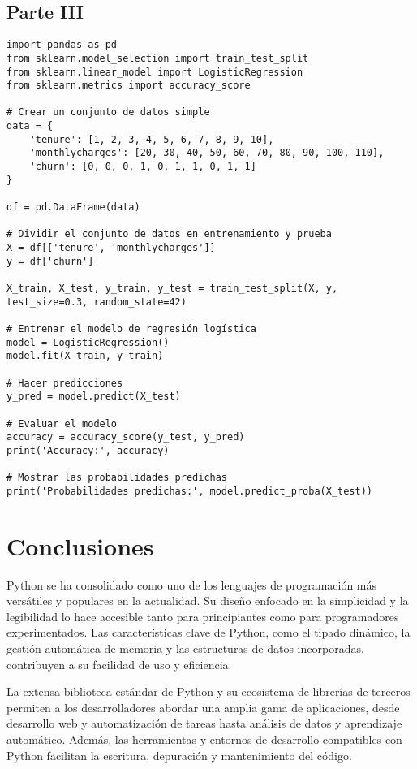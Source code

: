 \documentclass[10pt,a4paper]{article}
\begin{document}
\subsection{Parte III}
\begin{lstlisting}
import pandas as pd
from sklearn.model_selection import train_test_split
from sklearn.linear_model import LogisticRegression
from sklearn.metrics import accuracy_score

# Crear un conjunto de datos simple
data = {
    'tenure': [1, 2, 3, 4, 5, 6, 7, 8, 9, 10],
    'monthlycharges': [20, 30, 40, 50, 60, 70, 80, 90, 100, 110],
    'churn': [0, 0, 0, 1, 0, 1, 1, 0, 1, 1]
}

df = pd.DataFrame(data)

# Dividir el conjunto de datos en entrenamiento y prueba
X = df[['tenure', 'monthlycharges']]
y = df['churn']

X_train, X_test, y_train, y_test = train_test_split(X, y, test_size=0.3, random_state=42)

# Entrenar el modelo de regresión logística
model = LogisticRegression()
model.fit(X_train, y_train)

# Hacer predicciones
y_pred = model.predict(X_test)

# Evaluar el modelo
accuracy = accuracy_score(y_test, y_pred)
print('Accuracy:', accuracy)

# Mostrar las probabilidades predichas
print('Probabilidades predichas:', model.predict_proba(X_test))

\end{lstlisting}
\section{Conclusiones}
Python se ha consolidado como uno de los lenguajes de programación más versátiles y populares en la actualidad. Su diseño enfocado en la simplicidad y la legibilidad lo hace accesible tanto para principiantes como para programadores experimentados. Las características clave de Python, como el tipado dinámico, la gestión automática de memoria y las estructuras de datos incorporadas, contribuyen a su facilidad de uso y eficiencia.

La extensa biblioteca estándar de Python y su ecosistema de librerías de terceros permiten a los desarrolladores abordar una amplia gama de aplicaciones, desde desarrollo web y automatización de tareas hasta análisis de datos y aprendizaje automático. Además, las herramientas y entornos de desarrollo compatibles con Python facilitan la escritura, depuración y mantenimiento del código.
\end{document}
